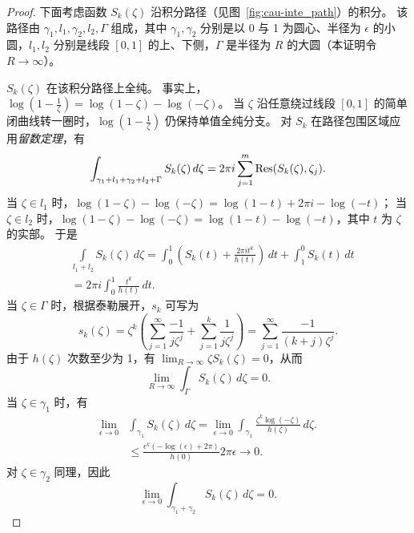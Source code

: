 \begin{proof}
下面考虑函数 \(S_k(\zeta)\) 沿积分路径（见图~\ref{fig:cau-inte_path}）的积分。
该路径由 \(\gamma_1,l_1,\gamma_2,l_2,\Gamma\) 组成，其中 \(\gamma_1,\gamma_2\) 分别是以 0 与 1 为圆心、半径为 \(\epsilon\) 的小圆，\(l_1,l_2\) 分别是线段 \([0,1]\) 的上、下侧，\(\Gamma\) 是半径为 \(R\) 的大圆（本证明令 \(R \to \infty\)）。

\(S_k(\zeta)\) 在该积分路径上全纯。
事实上，\(\log\left(1 - \frac{1}{\zeta}\right) = \log(1-\zeta) - \log(-\zeta)\)。
当 \(\zeta\) 沿任意绕过线段 \([0,1]\) 的简单闭曲线转一圈时，$\log\left(1 - \frac{1}{\zeta}\right)$ 仍保持单值全纯分支。
%
对 $S_k$ 在路径包围区域应用\emph{留数定理}，有
    \begin{equation}\label{equ:cau-residue_theorem}
        \begin{aligned}
 \int_{\gamma_1+l_1+\gamma_2+l_2+\Gamma} S_k(\zeta) \, d\zeta
            = 2\pi i \sum_{j=1}^{m} \mathop{\mathrm{Res}}(S_k(\zeta), \zeta_j).
        \end{aligned}
    \end{equation}
当 $\zeta\in l_1$ 时，$\log(1-\zeta)-\log(-\zeta)=\log(1-t)+2 \pi i-\log(-t)$；
当 $\zeta\in l_2$ 时，$\log(1-\zeta)-\log(-\zeta)=\log(1-t)-\log(-t)$，其中 $t$ 为 $\zeta$ 的实部。
于是
\begin{equation}\label{equ:cau-l1l2}
\begin{aligned}
    &\int\limits_{l_1+l_2} S_k(\zeta) \, d\zeta=\int_{0}^1 \left(S_k(t) +\frac{2\pi i t^k}{h(t)}\right)\, dt+\int_1^0 S_k(t) \, dt\\
    &=2\pi i \int_{0}^{1} \frac{ t^k}{h(t)} \, dt.
    \end{aligned}
\end{equation}
 当 \( \zeta \in \Gamma \) 时，根据泰勒展开，\( s_k \) 可写为
    \begin{equation}
        s_k(\zeta)=\zeta^k(\sum_{j=1}^{\infty}\frac{-1}{j \zeta^j}+\sum_{j=1}^k\frac{1}{j \zeta^j})=\sum_{j=1}^\infty\frac{-1}{(k+j) \zeta^{j}}.
    \end{equation}
    由于 $h(\zeta)$ 次数至少为 1，有 $\lim_{R\to \infty}\zeta S_k(\zeta)=0$，从而
    \begin{equation}\label{equ:cau-Gamma}
        \lim\limits_{R\to \infty}\int_{\Gamma} S_k(\zeta) \, d\zeta=0.
    \end{equation}
    当 $\zeta \in \gamma_1$ 时，有
    \begin{equation}
    \begin{aligned}
       \lim\limits_{\epsilon\to 0} &\int_{\gamma_1} S_k(\zeta) \, d\zeta=\lim\limits_{\epsilon\to 0}\int_{\gamma_1} \frac{\zeta^k \log(-\zeta)}{h(\zeta)}\, d\zeta.\\
       &\leq \frac{\epsilon^k (-\log(\epsilon)+2 \pi)}{h(0)}2 \pi \epsilon \to 0.
       \end{aligned}
    \end{equation}
    对 $\zeta \in \gamma_2$ 同理，因此
    \begin{equation}\label{equ:cau-gamma12}
       \lim\limits_{\epsilon\to 0} \int_{\gamma_1+\gamma_2} S_k(\zeta) \, d\zeta=0.
    \end{equation}


\end{proof}

